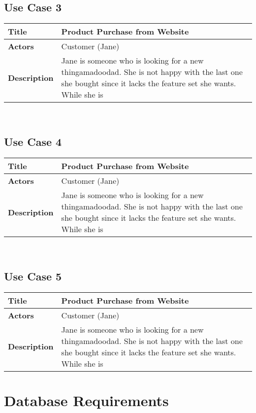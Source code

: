 \documentclass{article}
\begin{document}
\subsection{Use Case 3}
\begin{tabular}{ | l | l | }
\hline
\textbf{Title} & Product Purchase from Website\\
\hline
\textbf{Actors} &	Customer (Jane)	\\
\hline
\textbf{Description} & Jane is someone who is looking for a new thingamadoodad.  She is not happy with the last one she bought since it lacks the feature set she wants.  While she is\\
\hline
\end{tabular}
\hfill\\

\subsection{Use Case 4}
\begin{tabular}{ | l | l | }
\hline
\textbf{Title} & Product Purchase from Website\\
\hline
\textbf{Actors} &	Customer (Jane)	\\
\hline
\textbf{Description} & Jane is someone who is looking for a new thingamadoodad.  She is not happy with the last one she bought since it lacks the feature set she wants.  While she is\\
\hline
\end{tabular}
\hfill\\

\subsection{Use Case 5}
\begin{tabular}{ | l | l | }
\hline
\textbf{Title} & Product Purchase from Website\\
\hline
\textbf{Actors} &	Customer (Jane)	\\
\hline
\textbf{Description} & Jane is someone who is looking for a new thingamadoodad.  She is not happy with the last one she bought since it lacks the feature set she wants.  While she is\\
\hline
\end{tabular}

\section{Database Requirements}
\end{document}
